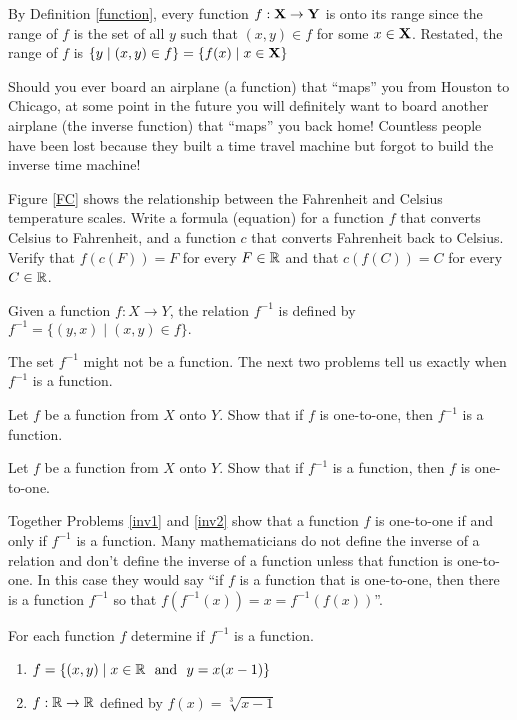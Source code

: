 By Definition \ref{function}, every function $f: \mathbf X \to \mathbf Y$ is onto its range since the range of $f$ is the set of all $y$ such that $(x,y) \in f$ for some $x \in \mathbf X$.  Restated, the range of $f$ is $\{ y  \mid  (x,y) \in f \} = \{ f(x)  \mid  x \in \mathbf X \}$

Should you ever board an airplane (a function) that ``maps'' you from Houston to Chicago, at some point in the future you will definitely want to board another airplane (the inverse function) that ``maps'' you back home!    Countless people have been lost because they built a time travel machine but forgot to build the inverse time machine!

\begin{prb}
Figure \ref{FC} shows the relationship between the Fahrenheit and Celsius temperature scales. Write a formula (equation) for a  function $f$ that converts Celsius to Fahrenheit, and a function $c$ that converts Fahrenheit back to Celsius.  Verify that $f(c(F)) = F$ for every $F \in \mathbb R$  and that $c(f(C)) = C$ for every $C \in \mathbb R$.
\end{prb}

\begin{dfn} \label{invrelation}
Given a function $f: X \to Y$, the relation $f^{-1}$ is defined by $f^{-1} = \{ (y,x)  \mid  (x,y) \in f \}.$
\end{dfn}

The set $f^{-1}$ might not be a function.  The next two problems tell us exactly when $f^{-1}$ is a function.

\begin{prb}
\label{inv1}
Let $f$ be a function from $X$ onto $Y$.  Show that if $f$ is one-to-one, then $f^{-1}$ is a function.
\end{prb}

\begin{prb}
\label{inv2}
Let $f$ be a function from $X$ onto $Y$.  Show that if $f^{-1}$ is a function, then $f$ is one-to-one.
\end{prb}

Together Problems \ref{inv1} and \ref{inv2} show that a function $f$ is one-to-one if and only if $f^{-1}$ is a function.   Many mathematicians do not define the inverse of a relation and don't define the inverse of a function unless that function is one-to-one.  In this case they would say ``if $f$ is a function that is one-to-one, then there is a function $f^{-1}$ so that $f(f^{-1}(x))=x=f^{-1}(f(x))$''.  

\begin{prb}
For each function $f$ determine if $f^{-1}$ is a function.
\begin{enumerate}
\item $f = \{ (x,y) 
 \mid  x \in \mathbb R \ \mbox{ and } \ y = x(x-1) \}$
\item $f : \mathbb R \to \mathbb R$ defined by $f(x) = \sqrt[3]{x-1}$
\end{enumerate}
\end{prb}

